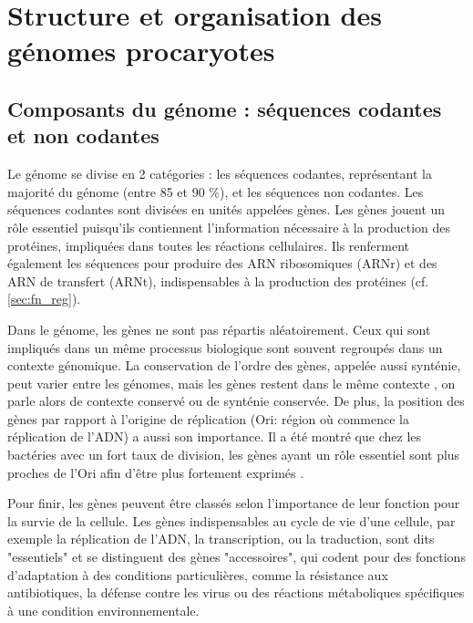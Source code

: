 \section{Structure et organisation des génomes procaryotes}
\label{sec:structure_org}

\subsection{Composants du génome : séquences codantes et non codantes}
\label{sec:gene}

Le génome se divise en 2 catégories : les séquences codantes, représentant la majorité du génome (entre 85 et 90 \%), et les séquences non codantes. Les séquences codantes sont divisées en unités appelées gènes. Les gènes jouent un rôle essentiel puisqu’ils contiennent l’information nécessaire à la production des protéines, impliquées dans toutes les réactions cellulaires. Ils renferment également les séquences pour produire des ARN ribosomiques (ARNr) et des ARN de transfert (ARNt), indispensables à la production des protéines (cf. \autoref{sec:fn_reg}).

Dans le génome, les gènes ne sont pas répartis aléatoirement. Ceux qui sont impliqués dans un même processus biologique sont souvent regroupés dans un contexte génomique. La conservation de l'ordre des gènes, appelée aussi synténie, peut varier entre les génomes, mais les gènes restent dans le même contexte \cite{lathe_gene_2000}, on parle alors de contexte conservé ou de synténie conservée. De plus, la position des gènes par rapport à l'origine de réplication (Ori: région où commence la réplication de l'ADN) a aussi son importance. Il a été montré que chez les bactéries avec un fort taux de division, les gènes ayant un rôle essentiel sont plus proches de l'Ori afin d'être plus fortement exprimés \cite{sharp_chromosomal_1989,vieira-silva_systemic_2010}.

Pour finir, les gènes peuvent être classés selon l’importance de leur fonction pour la survie de la cellule. Les gènes indispensables au cycle de vie d'une cellule, par exemple la réplication de l’ADN, la transcription, ou la traduction, sont dits "essentiels" et se distinguent des gènes "accessoires", qui codent pour des fonctions d'adaptation à des conditions particulières, comme la résistance aux antibiotiques, la défense contre les virus ou des réactions métaboliques spécifiques à une condition environnementale.

